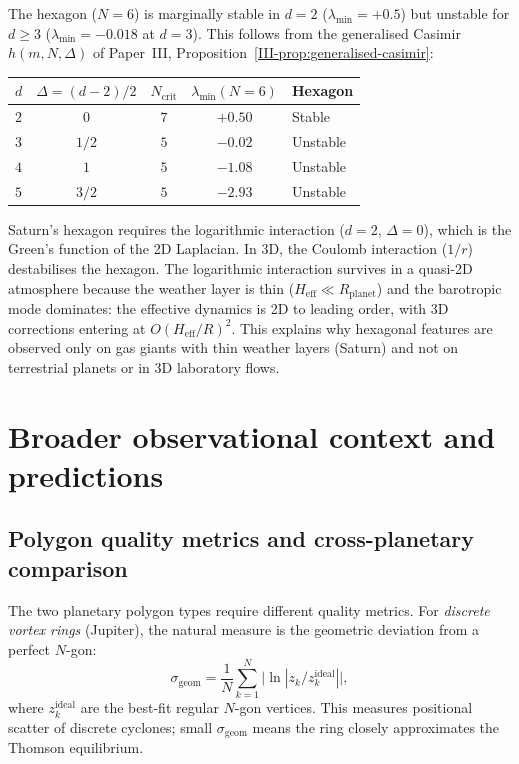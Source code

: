 The hexagon ($N = 6$) is marginally stable in $d = 2$
($\lambda_{\min} = +0.5$) but unstable for $d \ge 3$
($\lambda_{\min} = -0.018$ at $d = 3$).
This follows from the generalised Casimir
$h(m, N, \Delta)$ of Paper~III,
Proposition~\ref{III-prop:generalised-casimir}:
\begin{center}
\small
\begin{tabular}{lcccl}
\toprule
$d$ & $\Delta = (d{-}2)/2$ & $N_{\mathrm{crit}}$ &
  $\lambda_{\min}(N{=}6)$ & Hexagon \\
\midrule
$2$ & $0$ & $7$ & $+0.50$ & Stable \\
$3$ & $1/2$ & $5$ & $-0.02$ & Unstable \\
$4$ & $1$ & $5$ & $-1.08$ & Unstable \\
$5$ & $3/2$ & $5$ & $-2.93$ & Unstable \\
\bottomrule
\end{tabular}
\end{center}
\noindent
Saturn's hexagon requires the logarithmic interaction
($d = 2$, $\Delta = 0$), which is the Green's function of
the 2D Laplacian.  In 3D, the Coulomb interaction ($1/r$)
destabilises the hexagon.
The logarithmic interaction survives in a quasi-2D
atmosphere because the weather layer is thin
($H_{\mathrm{eff}} \ll R_{\mathrm{planet}}$) and the
barotropic mode dominates: the effective dynamics is
2D to leading order, with 3D corrections entering at
$O(H_{\mathrm{eff}}/R)^2$.
This explains why hexagonal features are observed only on
gas giants with thin weather layers (Saturn) and not on
terrestrial planets or in 3D laboratory flows.

\section{Broader observational context and predictions}
\label{sec:observations}
\label{sec:planets}

\subsection{Polygon quality metrics and cross-planetary comparison}

The two planetary polygon types require different quality metrics.
For \emph{discrete vortex rings} (Jupiter), the natural measure is the
geometric deviation from a perfect $N$-gon:
\begin{equation}\label{eq:sigma-geom}
  \sigma_{\mathrm{geom}} = \frac{1}{N}\sum_{k=1}^{N}
  \bigl|\!\ln|z_k / z_k^{\mathrm{ideal}}|\bigr|,
\end{equation}
where $z_k^{\mathrm{ideal}}$ are the best-fit regular $N$-gon vertices.
This measures positional scatter of discrete cyclones; small
$\sigma_{\mathrm{geom}}$ means the ring closely approximates the
Thomson equilibrium.

